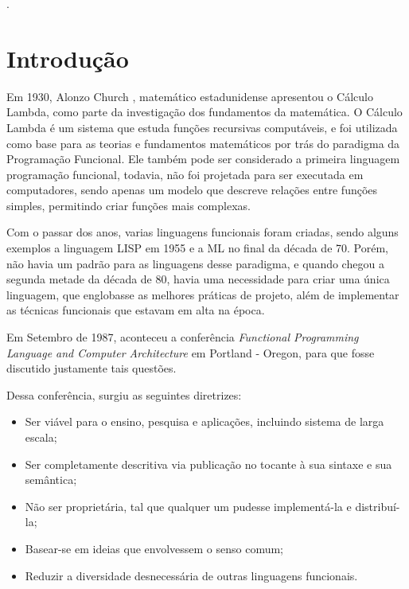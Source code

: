 \documentclass[
  article,			       %
  12pt,				         %
  oneside,			       %
  a4paper,			       %
  english,		       	 %
  brazil,			      	 %
  sumario=tradicional
]{abntex2}
\begin{document}
 

    \renewcommand{\thesection}{\noindent\arabic{chapter}.\arabic{section}}. 


    \frenchspacing

    \imprimircapa

    \tableofcontents*
    \cleardoublepage

    \textual

    \newpage

    \chapter{Introdução}

    Em 1930, Alonzo Church , matemático estadunidense apresentou o Cálculo Lambda, como parte da investigação dos fundamentos da matemática. O Cálculo Lambda é um sistema que
    estuda funções recursivas computáveis, e foi utilizada como base para as teorias e fundamentos matemáticos por trás do paradigma da Programação Funcional. Ele também
    pode ser considerado a primeira linguagem programação funcional, todavia, não foi projetada para ser executada em computadores, sendo apenas um modelo que descreve relações entre funções
    simples, permitindo criar funções mais complexas.

    Com o passar dos anos, varias linguagens funcionais foram criadas, sendo alguns exemplos a linguagem LISP em 1955 e a ML no final da década de 70. Porém, não
    havia um padrão para as linguagens desse paradigma, e quando chegou a segunda metade da década de 80, havia uma necessidade para criar uma única linguagem, que englobasse
    as melhores práticas de projeto, além de implementar as técnicas funcionais que estavam em alta na época.

    Em Setembro de 1987, aconteceu a conferência \emph{Functional Programming Language and Computer Architecture} em Portland - Oregon, para que fosse discutido justamente
    tais questões.

    Dessa conferência, surgiu as seguintes diretrizes:
    \begin{itemize}
      \item Ser viável para o ensino, pesquisa e aplicações, incluindo sistema de larga escala;
      \item Ser completamente descritiva via publicação no tocante à sua sintaxe e sua semântica;
      \item Não ser proprietária, tal que qualquer um pudesse implementá-la e distribuí-la;
      \item Basear-se em ideias que envolvessem o senso comum;
      \item Reduzir a diversidade desnecessária de outras linguagens funcionais.
    \end{itemize}
\end{document}
